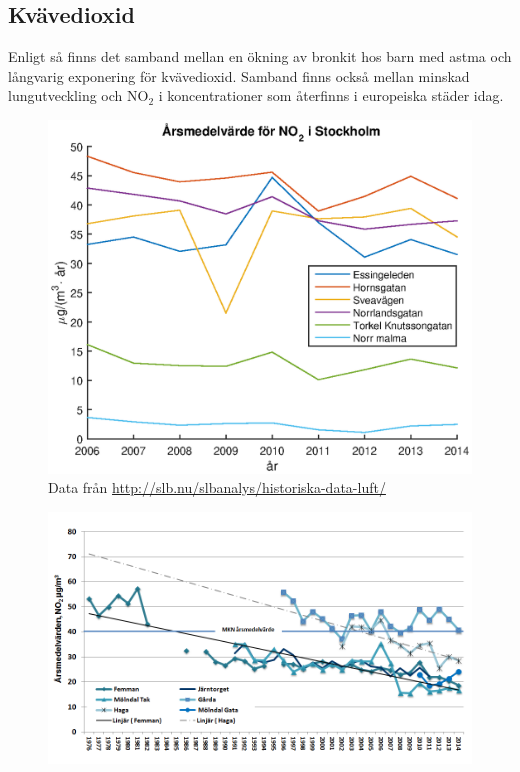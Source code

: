 \subsection{Kvävedioxid}
Enligt \textcite{whoAir} så finns det samband mellan en ökning av bronkit hos barn med astma och långvarig exponering för kvävedioxid. Samband finns också mellan minskad lungutveckling och NO$_2$ i koncentrationer som återfinns i europeiska städer idag.
\begin{figure}[H]
	\centering
	\includegraphics[width=.8\textwidth]{Bilder/NO2sth}
	\caption{Data från \url{http://slb.nu/slbanalys/historiska-data-luft/}}
	\label{fig:NO2sth}
\end{figure}

\begin{figure}[H]
	\centering
	\includegraphics[width=.8\textwidth]{Bilder/NO2gbg}
	\caption{\cite{gbg}}
	\label{fig:NO2gbg}
\end{figure}
